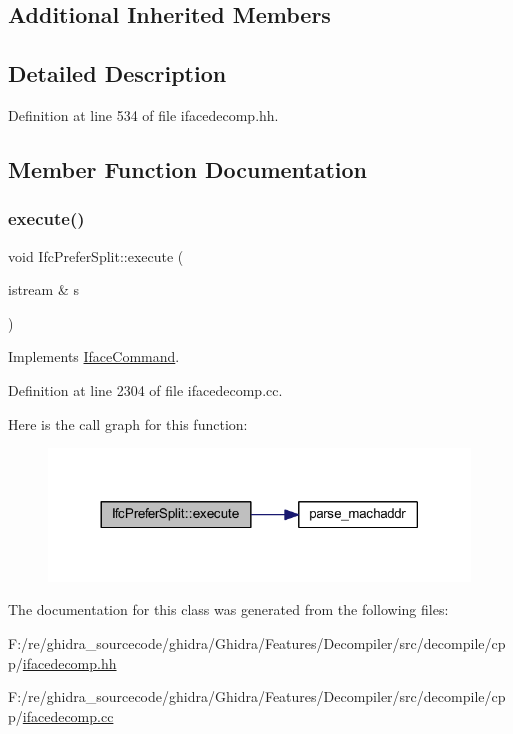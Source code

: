 \subsection*{Additional Inherited Members}


\subsection{Detailed Description}


Definition at line 534 of file ifacedecomp.\+hh.



\subsection{Member Function Documentation}
\mbox{\label{class_ifc_prefer_split_aaf3f2d962ed56ee7e784b8b88ca073d9}} 
\subsubsection{\texorpdfstring{execute()}{execute()}}
{\footnotesize\ttfamily void Ifc\+Prefer\+Split\+::execute (\begin{DoxyParamCaption}\item[{istream \&}]{s }\end{DoxyParamCaption})\hspace{0.3cm}{\ttfamily [virtual]}}



Implements \mbox{\hyperlink{class_iface_command_af10e29cee2c8e419de6efe9e680ad201}{Iface\+Command}}.



Definition at line 2304 of file ifacedecomp.\+cc.

Here is the call graph for this function\+:
\nopagebreak
\begin{figure}[H]
\begin{center}
\leavevmode
\includegraphics[width=317pt]{class_ifc_prefer_split_aaf3f2d962ed56ee7e784b8b88ca073d9_cgraph}
\end{center}
\end{figure}


The documentation for this class was generated from the following files\+:\begin{DoxyCompactItemize}
\item 
F\+:/re/ghidra\+\_\+sourcecode/ghidra/\+Ghidra/\+Features/\+Decompiler/src/decompile/cpp/\mbox{\hyperlink{ifacedecomp_8hh}{ifacedecomp.\+hh}}\item 
F\+:/re/ghidra\+\_\+sourcecode/ghidra/\+Ghidra/\+Features/\+Decompiler/src/decompile/cpp/\mbox{\hyperlink{ifacedecomp_8cc}{ifacedecomp.\+cc}}\end{DoxyCompactItemize}
